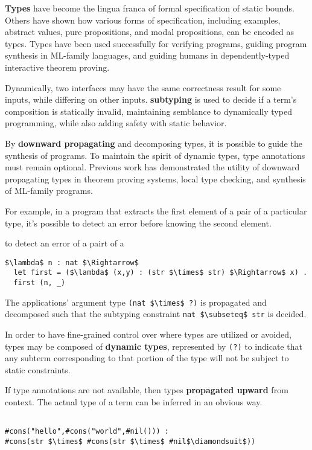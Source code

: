 \documentclass[sigplan,screen]{acmart}
\begin{document}
\textbf{Types} have become the lingua franca of formal specification of static bounds.
Others have shown how various forms of specification, including examples, abstract values, 
pure propositions, and modal propositions, can be encoded as types.
Types have been used successfully for verifying programs, 
guiding program synthesis in ML-family languages, 
and guiding humans in dependently-typed interactive theorem proving. 

Dynamically, two interfaces may have the same correctness result for some inputs,
while differing on other inputs. \textbf{subtyping} is used to decide if a term's 
composition is statically invalid, maintaining semblance to dynamically typed programming,
while also adding safety with static behavior.

By \textbf{downward propagating} and decomposing types, 
it is possible to guide the synthesis of programs.
To maintain the spirit of dynamic types, type annotations must remain optional.
Previous work has demonstrated the utility of downward propagating types 
in theorem proving systems, local type checking, 
and synthesis of ML-family programs.

For example, in a program that extracts 
the first element of a pair of a particular type, 
it's possible to detect an error before knowing the second element.

to detect an error of a pairt of a   
\begin{lstlisting}
$\lambda$ n : nat $\Rightarrow$
  let first = ($\lambda$ (x,y) : (str $\times$ str) $\Rightarrow$ x) .
  first (n, _) 
\end{lstlisting}

\noindent The  applications' argument type \lstinline{(nat $\times$ ?)} 
is propagated and decomposed such that the subtyping constraint 
\lstinline{nat $\subseteq$ str} is decided. 

In order to have fine-grained control over where types are utilized or avoided, 
types may be composed of \textbf{dynamic types}, represented by \lstinline{(?)} to indicate 
that any subterm corresponding to that portion of the type 
will not be subject to static constraints.

If type annotations are not available, then types \textbf{propagated upward} from context. 
The actual type of a term can be inferred in an obvious way.

\begin{lstlisting}

#cons("hello",#cons("world",#nil())) : 
#cons(str $\times$ #cons(str $\times$ #nil$\diamondsuit$))

\end{lstlisting}
\end{document}
